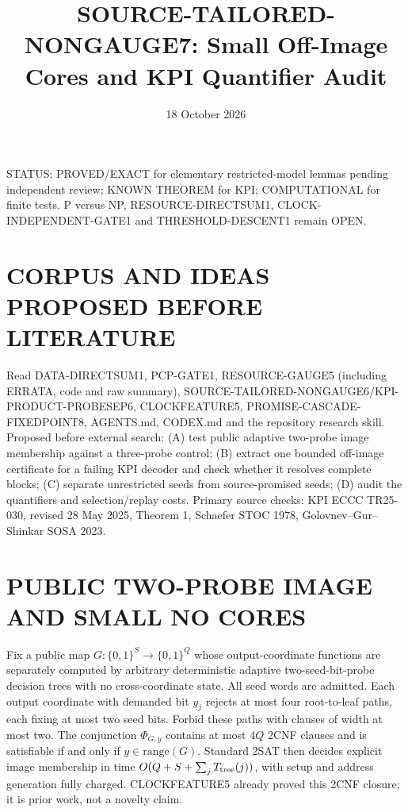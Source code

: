 \documentclass[11pt]{article}
\title{SOURCE-TAILORED-NONGAUGE7: Small Off-Image Cores and KPI Quantifier Audit}
\date{18 October 2026}
\begin{document}
\maketitle
\noindent STATUS: PROVED/EXACT for elementary restricted-model lemmas pending independent review; KNOWN THEOREM for KPI; COMPUTATIONAL for finite tests. P versus NP, RESOURCE-DIRECTSUM1, CLOCK-INDEPENDENT-GATE1 and THRESHOLD-DESCENT1 remain OPEN.
\section{CORPUS AND IDEAS PROPOSED BEFORE LITERATURE}
Read DATA-DIRECTSUM1, PCP-GATE1, RESOURCE-GAUGE5 (including ERRATA, code and raw summary), SOURCE-TAILORED-NONGAUGE6/KPI-PRODUCT-PROBESEP6, CLOCKFEATURE5, PROMISE-CASCADE-FIXEDPOINT8, AGENTS.md, CODEX.md and the repository research skill. Proposed before external search: (A) test public adaptive two-probe image membership against a three-probe control; (B) extract one bounded off-image certificate for a failing KPI decoder and check whether it resolves complete blocks; (C) separate unrestricted seeds from source-promised seeds; (D) audit the quantifiers and selection/replay costs. Primary source checks: KPI ECCC TR25-030, revised 28 May 2025, Theorem 1, Schaefer STOC 1978, Golovnev--Gur--Shinkar SOSA 2023.
\section{PUBLIC TWO-PROBE IMAGE AND SMALL NO CORES}
Fix a public map \(G:\{0,1\}^S\to\{0,1\}^Q\) whose output-coordinate functions are separately computed by arbitrary deterministic adaptive two-seed-bit-probe decision trees with no cross-coordinate state. All seed words are admitted. Each output coordinate with demanded bit \(y_j\) rejects at most four root-to-leaf paths, each fixing at most two seed bits. Forbid these paths with clauses of width at most two. The conjunction \(\Phi_{G,y}\) contains at most \(4Q\) 2CNF clauses and is satisfiable if and only if \(y\in\mathrm{range}(G)\). Standard 2SAT then decides explicit image membership in time \(O(Q+S+\sum_j T_{\rm tree}(j))\), with setup and address generation fully charged. CLOCKFEATURE5 already proved this 2CNF closure; it is prior work, not a novelty claim.
\end{document}
